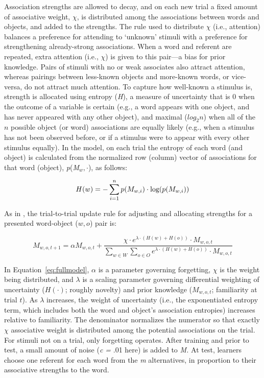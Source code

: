 \documentclass[man,floatsintext]{apa6}
\begin{document}
Association strengths are allowed to decay, and on each new trial a fixed amount of associative weight, $\chi$, is distributed among the associations between words and objects, and added to the strengths. The rule used to distribute $\chi$ (i.e., attention) balances a preference for attending to `unknown' stimuli with a preference for strengthening already-strong associations. When a word and referent are repeated, extra attention (i.e., $\chi$) is given to this pair---a bias for prior knowledge. Pairs of stimuli with no or weak associates also attract attention, whereas pairings between less-known objects and more-known words, or vice-versa, do not attract much attention. To capture how well-known a stimulus is, strength is allocated using entropy (\textit{H}), a measure of uncertainty that is 0 when the outcome of a variable is certain (e.g., a word appears with one object, and has never appeared with any other object), and maximal ($log_2 n$) when all of the $n$ possible object (or word) associations are equally likely (e.g., when a stimulus has not been observed before, or if a stimulus were to appear with every other stimulus equally). In the model, on each trial the entropy of each word (and object) is calculated from the normalized row (column) vector of associations for that word (object), \textit{p}(\textit{M$_w,\cdot$}), as follows:

\begin{equation}
  H(w) = - \sum_{i=1}^{n} p(M_{w,i}) \cdot \textnormal{log}( p(M_{w,i} ) )
  \label{eqn:entropy}
\end{equation}

As in \cite{Kachergis:2012gi}, the trial-to-trial update rule for adjusting and allocating strengths for a presented word-object ($w,o$) pair is:

\begin{equation}
  M_{w,o,t+1} =  \alpha M_{w,o,t} + \frac{ \chi \cdot e^{ \lambda \cdot (H(w) + H(o)) } \cdot M_{w,o,t}  }{  \sum_{w\in W} \sum_{o\in O} e^{ \lambda \cdot (H(w) + H(o)) } \cdot M_{w,o,t} }
  \label{eq:fullmodel}
\end{equation}

In Equation~\ref{eq:fullmodel}, $\alpha$ is a parameter governing forgetting, $\chi$ is the weight being distributed, and $\lambda$ is a scaling parameter governing differential weighting of uncertainty ($H(\cdot)$; roughly novelty) and prior knowledge ($M_{w,o,t}$; familiarity at trial $t$). As $\lambda$ increases, the weight of uncertainty (i.e., the exponentiated entropy term, which includes both the word and object's association entropies) increases relative to familiarity. The denominator normalizes the numerator so that exactly $\chi$ associative weight is distributed among the potential associations on the trial. For stimuli not on a trial, only forgetting operates. After training and prior to test, a small amount of noise (\textit{c = }.01 here) is added to \textit{M.} At test, learners choose one referent for each word from the \textit{m} alternatives, in proportion to their associative strengths to the word. 
\end{document}

